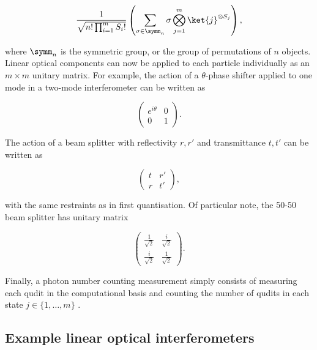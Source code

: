\begin{equation}
\frac{1}{\sqrt{n!\prod_{i=1}^mS_i!}}\left(\sum_{\sigma\in\symm_n}\sigma\bigotimes_{j=1}^m\ket{j}^{\otimes S_j}\right),
\end{equation}

\noindent where $\symm_n$ is the symmetric group, or the group of permutations of $n$ objects. Linear optical components can now be applied to each particle individually as an $m \times m$ unitary matrix. For example, the action of a $\theta$-phase shifter applied to one mode in a two-mode interferometer can be written as

\begin{equation}
\begin{pmatrix}
e^{i\theta} & 0\\
0 & 1
\end{pmatrix}.
\end{equation}

\noindent The action of a beam splitter with reflectivity $r, r'$ and transmittance $t, t'$ can be written as

\begin{equation}
\begin{pmatrix}
t & r'\\
r & t'
\end{pmatrix},
\end{equation}

\noindent with the same restraints as in first quantisation. Of particular note, the 50-50 beam splitter has unitary matrix

\begin{equation}
\begin{pmatrix}
\frac{1}{\sqrt{2}} & \frac{i}{\sqrt{2}}\\
\frac{i}{\sqrt{2}} & \frac{1}{\sqrt{2}}
\end{pmatrix}.
\end{equation}

Finally, a photon number counting measurement simply consists of measuring each qudit in the computational basis and counting the number of qudits in each state $j \in \{1,\dots,m\}$ .

\subsection{Example linear optical interferometers}
\label{ssec:example-interferometers}


